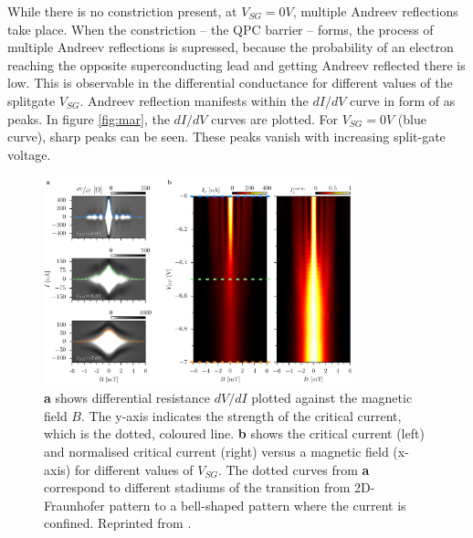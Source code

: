 While there is no constriction present, at $V_{SG} = 0 V$, multiple Andreev reflections take place. When the constriction -- the QPC barrier -- forms, the process of multiple Andreev reflections is supressed, because the probability of an electron reaching the opposite superconducting lead and getting Andreev reflected there is low. This is observable in the differential conductance for different values of the splitgate $V_{SG}$. Andreev reflection manifests within the $dI/dV$ curve in form of as peaks. In figure \ref{fig:mar}, the $dI/dV$ curves are plotted. For $V_{SG} = 0 V$ (blue curve), sharp peaks can be seen. These peaks vanish with increasing split-gate voltage.
\begin{figure}
\centering
\includegraphics[width=0.8\textwidth]{figure/experiment/supercurrent}
\caption{\textbf{a} shows differential resistance $dV/dI$ plotted against the magnetic field $B$. The y-axis indicates the strength of the critical current, which is the dotted, coloured line. \textbf{b} shows the critical current (left) and normalised critical current (right) versus a magnetic field (x-axis) for different values of $V_{SG}$. The dotted curves from \textbf{a} correspond to different stadiums of the transition from 2D-Fraunhofer pattern to a bell-shaped pattern where the current is confined. Reprinted from \cite{Kraft2017}.}\label{fig:supercurrent}
\end{figure}

